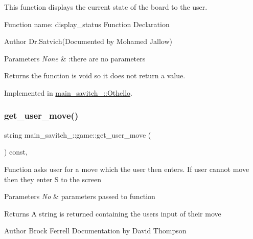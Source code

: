 This function displays the current state of the board to the user. 

Function name\+: display\+\_\+status Function Declaration \begin{DoxyAuthor}{Author}
Dr.\+Satvich(\+Documented by Mohamed Jallow) 
\end{DoxyAuthor}

\begin{DoxyParams}{Parameters}
{\em None} & \+:there are no parameters \\
\hline
\end{DoxyParams}
\begin{DoxyReturn}{Returns}
the function is void so it does not return a value. 
\end{DoxyReturn}


Implemented in \mbox{\hyperlink{classmain__savitch__14_1_1_othello_ab01a4f7aba130133221a11224905e8ce}{main\+\_\+savitch\+\_\+::\+Othello}}.

\mbox{\label{classmain__savitch__14_1_1game_a6504d401fcc8b138ae6342c2868c8a40}} 
\subsubsection{\texorpdfstring{get\+\_\+user\+\_\+move()}{get\_user\_move()}}
{\footnotesize\ttfamily string main\+\_\+savitch\+\_\+::game\+::get\+\_\+user\+\_\+move (\begin{DoxyParamCaption}{ }\end{DoxyParamCaption}) const\hspace{0.3cm}{\ttfamily [protected]}, {\ttfamily [virtual]}}

Function asks user for a move which the user then enters. If user cannot move then they enter \textquotesingle{}S\textquotesingle{} to the screen 
\begin{DoxyParams}{Parameters}
{\em No} & parameters passed to function \\
\hline
\end{DoxyParams}
\begin{DoxyReturn}{Returns}
A string is returned containing the users input of their move 
\end{DoxyReturn}
\begin{DoxyAuthor}{Author}
Brock Ferrell Documentation by David Thompson 
\end{DoxyAuthor}
\mbox{\label{classmain__savitch__14_1_1game_a4dbeaddb78059f7c5dcbf5cc4e026317}} 
